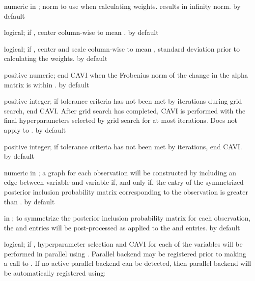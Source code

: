 \documentclass[a4paper]{book}
\begin{document}
\begin{Arguments}
\begin{ldescription}
\item[\code{norm}] numeric in \eqn{[1, \infty]}{}; norm to use when
calculating weights.  results in infinity norm.  by default

\item[\code{center\_X}] logical; if , center  column-wise to mean .
 by default

\item[\code{scale\_Z}] logical; if , center and scale  column-wise to mean
, standard deviation  prior to calculating the weights. 
by default

\item[\code{alpha\_tol}] positive numeric; end CAVI when the Frobenius norm of the
change in the alpha matrix is within .  by default

\item[\code{max\_iter\_grid}] positive integer; if tolerance criteria has not been
met by  iterations during grid search, end CAVI. After grid
search has completed, CAVI is performed with the final hyperparameters
selected by grid search for at most  iterations. Does not apply to
.  by default

\item[\code{max\_iter}] positive integer; if tolerance criteria has not been met by
 iterations, end CAVI.  by default

\item[\code{edge\_threshold}] numeric in ; a graph for each observation
will be constructed by including an edge between variable  and
variable  if, and only if, the  entry of the symmetrized
posterior inclusion probability matrix corresponding to the observation is
greater than .  by default

\item[\code{sym\_method}]  in ; to symmetrize
the posterior inclusion probability matrix for each observation, the
 and  entries will be post-processed as 
applied to the  and  entries.  by default

\item[\code{parallel}] logical; if , hyperparameter selection and CAVI for
each of the  variables will be performed in parallel using .
Parallel backend may be registered prior to making a call to . If
no active parallel backend can be detected, then parallel backend will be
automatically registered using:


\end{ldescription}
\end{Arguments}
\end{document}
